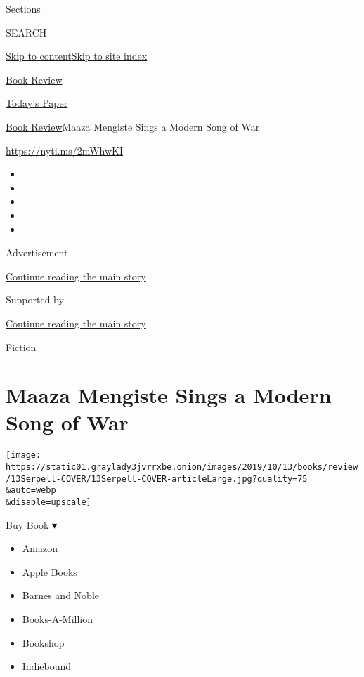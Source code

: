 Sections

SEARCH

\protect\hyperlink{site-content}{Skip to
content}\protect\hyperlink{site-index}{Skip to site index}

\href{https://www.nytimes3xbfgragh.onion/section/books/review}{Book
Review}

\href{https://myaccount.nytimes3xbfgragh.onion/auth/login?response_type=cookie\&client_id=vi}{}

\href{https://www.nytimes3xbfgragh.onion/section/todayspaper}{Today's
Paper}

\href{/section/books/review}{Book Review}\textbar{}Maaza Mengiste Sings
a Modern Song of War

\url{https://nyti.ms/2mWhwKI}

\begin{itemize}
\item
\item
\item
\item
\item
\end{itemize}

Advertisement

\protect\hyperlink{after-top}{Continue reading the main story}

Supported by

\protect\hyperlink{after-sponsor}{Continue reading the main story}

Fiction

\hypertarget{maaza-mengiste-sings-a-modern-song-of-war}{%
\section{Maaza Mengiste Sings a Modern Song of
War}\label{maaza-mengiste-sings-a-modern-song-of-war}}

\texttt{[image: https://static01.graylady3jvrrxbe.onion/images/2019/10/13/books/review/13Serpell-COVER/13Serpell-COVER-articleLarge.jpg?quality=75\\\&auto=webp\\\&disable=upscale]}

Buy Book ▾

\begin{itemize}
\tightlist
\item
  \href{https://www.amazon.com/gp/search?index=books\&tag=NYTBSREV-20\&field-keywords=The+Shadow+King+Maaza+Mengiste}{Amazon}
\item
  \href{https://du-gae-books-dot-nyt-du-prd.appspot.com/buy?title=The+Shadow+King\&author=Maaza+Mengiste}{Apple
  Books}
\item
  \href{https://www.anrdoezrs.net/click-7990613-11819508?url=https\%3A\%2F\%2Fwww.barnesandnoble.com\%2Fw\%2F\%3Fean\%3D9780393083569}{Barnes
  and Noble}
\item
  \href{https://www.anrdoezrs.net/click-7990613-35140?url=https\%3A\%2F\%2Fwww.booksamillion.com\%2Fp\%2FThe\%2BShadow\%2BKing\%2FMaaza\%2BMengiste\%2F9780393083569}{Books-A-Million}
\item
  \href{https://bookshop.org/a/3546/9780393083569}{Bookshop}
\item
  \href{https://www.indiebound.org/book/9780393083569?aff=NYT}{Indiebound}
\end{itemize}

